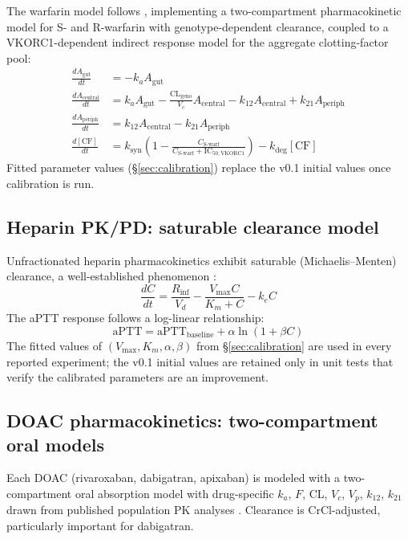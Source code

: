 \documentclass[11pt]{article}
\begin{document}
The warfarin model follows \citet{hamberg2007, hamberg2010}, implementing a two-compartment pharmacokinetic model for S- and R-warfarin with genotype-dependent clearance, coupled to a VKORC1-dependent indirect response model for the aggregate clotting-factor pool:
\begin{align}
  \frac{dA_{\text{gut}}}{dt} &= -k_a A_{\text{gut}} \\
  \frac{dA_{\text{central}}}{dt} &= k_a A_{\text{gut}} - \tfrac{\text{CL}_{\text{geno}}}{V_c} A_{\text{central}} - k_{12} A_{\text{central}} + k_{21} A_{\text{periph}} \\
  \frac{dA_{\text{periph}}}{dt} &= k_{12} A_{\text{central}} - k_{21} A_{\text{periph}} \\
  \frac{d[\text{CF}]}{dt} &= k_{\text{syn}} \left(1 - \tfrac{C_{\text{S-warf}}}{C_{\text{S-warf}} + \text{IC}_{50,\text{VKORC1}}}\right) - k_{\text{deg}} [\text{CF}]
\end{align}
Fitted parameter values (\S\ref{sec:calibration}) replace the v0.1 initial values once calibration is run.

\subsection{Heparin PK/PD: saturable clearance model}

Unfractionated heparin pharmacokinetics exhibit saturable (Michaelis--Menten) clearance, a well-established phenomenon \citep{hirsh2001}:
\begin{equation}
  \frac{dC}{dt} = \frac{R_{\text{inf}}}{V_d} - \frac{V_{\text{max}} C}{K_m + C} - k_e C
  \label{eq:heparin_pk}
\end{equation}
The aPTT response follows a log-linear relationship:
\begin{equation}
  \text{aPTT} = \text{aPTT}_{\text{baseline}} + \alpha \ln(1 + \beta C)
  \label{eq:heparin_aptt}
\end{equation}
The fitted values of $(V_{\max}, K_m, \alpha, \beta)$ from \S\ref{sec:calibration} are used in every reported experiment; the v0.1 initial values are retained only in unit tests that verify the calibrated parameters are an improvement.

\subsection{DOAC pharmacokinetics: two-compartment oral models}

Each DOAC (rivaroxaban, dabigatran, apixaban) is modeled with a two-compartment oral absorption model with drug-specific $k_a$, $F$, CL, $V_c$, $V_p$, $k_{12}$, $k_{21}$ drawn from published population PK analyses \citep{mueck2007}. Clearance is CrCl-adjusted, particularly important for dabigatran.
\end{document}
